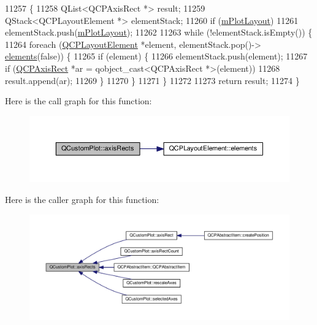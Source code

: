 \begin{DoxyCode}
11257                                                   \{
11258   QList<QCPAxisRect *> result;
11259   QStack<QCPLayoutElement *> elementStack;
11260   \textcolor{keywordflow}{if} (\hyperlink{class_q_custom_plot_ac97298756882a0eecd98151679850ac1}{mPlotLayout})
11261     elementStack.push(\hyperlink{class_q_custom_plot_ac97298756882a0eecd98151679850ac1}{mPlotLayout});
11262 
11263   \textcolor{keywordflow}{while} (!elementStack.isEmpty()) \{
11264     \textcolor{keywordflow}{foreach} (\hyperlink{class_q_c_p_layout_element}{QCPLayoutElement} *element, elementStack.pop()->
      \hyperlink{class_q_c_p_layout_element_a311d60d78e62ef8eaaedb1b6ceb9e788}{elements}(\textcolor{keyword}{false})) \{
11265       \textcolor{keywordflow}{if} (element) \{
11266         elementStack.push(element);
11267         \textcolor{keywordflow}{if} (\hyperlink{class_q_c_p_axis_rect}{QCPAxisRect} *ar = qobject\_cast<QCPAxisRect *>(element))
11268           result.append(ar);
11269       \}
11270     \}
11271   \}
11272 
11273   \textcolor{keywordflow}{return} result;
11274 \}
\end{DoxyCode}


Here is the call graph for this function\+:\nopagebreak
\begin{figure}[H]
\begin{center}
\leavevmode
\includegraphics[width=350pt]{class_q_custom_plot_afd67094aaeccbc5719761348b2d8c891_cgraph}
\end{center}
\end{figure}




Here is the caller graph for this function\+:\nopagebreak
\begin{figure}[H]
\begin{center}
\leavevmode
\includegraphics[width=350pt]{class_q_custom_plot_afd67094aaeccbc5719761348b2d8c891_icgraph}
\end{center}
\end{figure}


